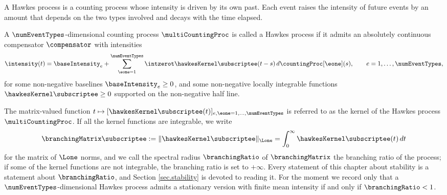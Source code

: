A Hawkes process is a counting process whose intensity is driven by its own past.
Each event raises the intensity of future events by an amount that depends on the two types
involved and decays with the time elapsed.

\begin{defi}\label{def.hawkesprocess}
 A $\numEventTypes$-dimensional counting process $\multiCountingProc$ is called a Hawkes process
 if it admits an absolutely continuous compensator $\compensator$ with intensities
 \begin{equation}\label{eq.intensity_ordHawkes}
  \intensity(t) = \baseIntensity_e
  + \sum_{\eone=1}^{\numEventTypes}\intzerot \hawkesKernel\subscriptee(t-s) \, d\countingProc[\eone](s),
  \qquad e = 1,\dots,\numEventTypes,
 \end{equation}
 for some non-negative baselines $\baseIntensity_e \geq 0$,
 and some non-negative locally integrable functions $\hawkesKernel\subscriptee \geq 0$
 supported on the non-negative half line.
\end{defi}

The matrix-valued function
$t\mapsto [\hawkesKernel\subscriptee(t)]_{e,\eone = 1, \dots, \numEventTypes}$
is referred to as the kernel of the Hawkes process $\multiCountingProc$.
If all the kernel functions are integrable, we write
\begin{equation}\label{eq.branchingMatrix}
 \branchingMatrix\subscriptee := \Vert \hawkesKernel\subscriptee \Vert_{\Lone}
 = \int_{0}^{\infty} \hawkesKernel\subscriptee(t) \, dt
\end{equation}
for the matrix of $\Lone$ norms,
and we call the spectral radius $\branchingRatio$ of $\branchingMatrix$ the branching ratio of
the process;
if some of the kernel functions are not integrable, the branching ratio is set to $+\infty$.
Every statement of this chapter about stability is a statement about $\branchingRatio$,
and Section \ref{sec.stability} is devoted to reading it.
For the moment we record only that a $\numEventTypes$-dimensional Hawkes process admits a
stationary version with finite mean intensity if and only if $\branchingRatio < 1$.


